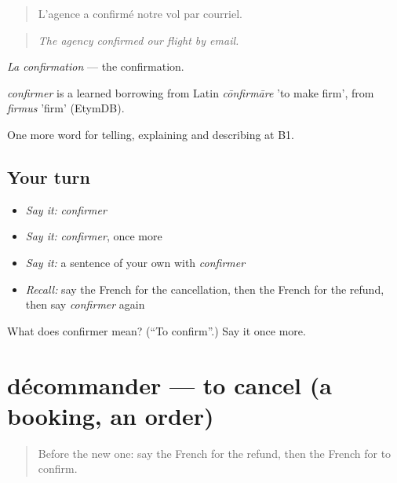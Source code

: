 \begin{quote}
L'agence a confirmé notre vol par courriel.
\end{quote}

\begin{quote}
\emph{The agency confirmed our flight by email.}
\end{quote}

\emph{La confirmation} — the confirmation.

\begin{cousinweb}
\emph{confirmer} is a learned borrowing from Latin \emph{cōnfirmāre} 'to make firm', from \emph{firmus} 'firm' (EtymDB).
\end{cousinweb}

\begin{grammarlens}[title={What you've built}]
One more word for telling, explaining and describing at B1.
\end{grammarlens}

\subsection*{Your turn}
\begin{itemize}
\raggedright
  \item \emph{Say it:} \emph{confirmer}
  \item \emph{Say it:} \emph{confirmer}, once more
  \item \emph{Say it:} a sentence of your own with \emph{confirmer}
  \item \emph{Recall:} say the French for the cancellation, then the French for the refund, then say \emph{confirmer} again
\end{itemize}

\begin{tcolorbox}[breakable,colback=teal!4,colframe=teal!35!black,title={Before you move on}]
What does confirmer mean? (\textquotedblleft{}To confirm\textquotedblright{}.) Say it once more.
\end{tcolorbox}
\section[décommander]{décommander — to cancel (a booking, an order)}

\label{lesson:FR-C421-decommander}



\begin{quote}
Before the new one: say the French for the refund, then the French for to confirm.
\end{quote}

